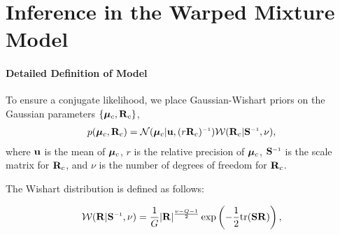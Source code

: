 









\chapter{Inference in the Warped Mixture Model}
\label{ch:warped-appendix}

\subsubsection{Detailed Definition of Model}

To ensure a conjugate likelihood, we place Gaussian-Wishart priors on the Gaussian parameters
$\{\bm{\mu}_{c},\mathbf{R}_{c}\}$,
\begin{align}
p(\bm{\mu}_{c},\vR_{c})
= {\cal N}(\bm{\mu}_{c}|\vu,(r\vR_{c})\inv)
{\cal W}(\vR_{c}|\vS\inv,\nu),
\end{align}
%
where ${\bf{u}}$ is the mean of ${\boldsymbol{\mu}}_c$, $r$ is the relative precision of ${\boldsymbol{\mu}}_{c}$, $\vS\inv$ is the scale matrix for $\mathbf{R}_c$, and $\nu$ is the number of degrees of freedom for $\mathbf{R}_c$.

The Wishart distribution is defined as follows:

\begin{align}
{\cal W}(\vR|\vS\inv,\nu)=\frac{1}{G}|\vR|^{\frac{\nu-Q-1}{2}}\exp\left(-\frac{1}{2}{\rm tr}(\vS\vR)\right),
\end{align}

